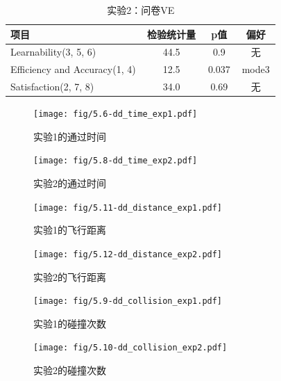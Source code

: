 \begin{table}[t]
    \vspace{0.5cm}

    \begin{minipage}{\textwidth}
        \centering
        \caption{实验2：问卷VE}
        \begin{tabular}{@{}p{0.5\linewidth}ccc@{}}
            \toprule
            \textbf{项目}                 & \textbf{检验统计量} & \textbf{p值} & \textbf{偏好} \\ \midrule
            Learnability(3, 5, 6)         & 44.5            & 0.9          & 无           \\
            Efficiency and Accuracy(1, 4) & 12.5            & 0.037        & mode3       \\
            Satisfaction(2, 7, 8)         & 34.0            & 0.69         & 无           \\ \bottomrule
        \end{tabular}
    \end{minipage}
\end{table}

\clearpage
\begin{figure}[htb]
    \texttt{[image: fig/5.6-dd\_time\_exp1.pdf]}
    \centering
    \caption{实验1的通过时间}
    \label{fig:5.6-dd_time_exp1}

    \texttt{[image: fig/5.8-dd\_time\_exp2.pdf]}
    \centering
    \caption{实验2的通过时间}
    \label{fig:5.8-dd_time_exp2}
\end{figure}

\begin{figure}[htb]
    \texttt{[image: fig/5.11-dd\_distance\_exp1.pdf]}
    \centering
    \caption{实验1的飞行距离}
    \label{fig:5.11-dd_distance_exp1}

    \texttt{[image: fig/5.12-dd\_distance\_exp2.pdf]}
    \centering
    \caption{实验2的飞行距离}
    \label{fig:5.12-dd_distance_exp2}
\end{figure}


\begin{figure}[htb]
    \texttt{[image: fig/5.9-dd\_collision\_exp1.pdf]}
    \centering
    \caption{实验1的碰撞次数}
    \label{fig:5.9-dd_collision_exp1}

    \texttt{[image: fig/5.10-dd\_collision\_exp2.pdf]}
    \centering
    \caption{实验2的碰撞次数}
    \label{fig:5.10-dd_collision_exp2}
\end{figure}



